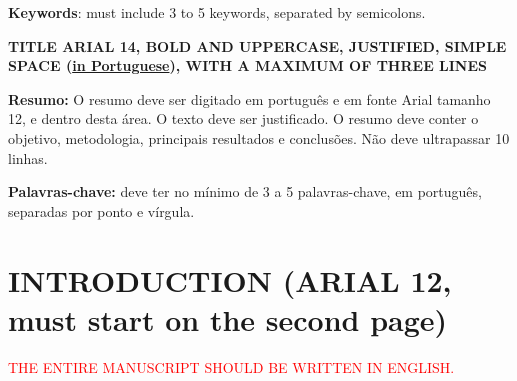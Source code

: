 \documentclass[
	article,			%
	12pt,				%
	oneside,			%
	a4paper,			%
	english,			%
	brazil,				%
	sumario=tradicional
	]{abntex2}
\begin{document}
   \vspace{\onelineskip}
   \noindent
   \textbf{Keywords}: must include 3 to 5 keywords, separated by semicolons.


   \vspace*{1.5cm}
   \noindent
   \textbf{\large{TITLE ARIAL 14, BOLD AND UPPERCASE, JUSTIFIED, SIMPLE SPACE (\underline{in Portuguese}), WITH A MAXIMUM OF THREE LINES}}

   \vspace{\onelineskip}
   \noindent
   \normalsize
   \textbf{Resumo:} O resumo deve ser digitado em português e em fonte Arial tamanho 12, e dentro desta área. O texto deve ser justificado. O resumo deve conter o objetivo, metodologia, principais resultados e conclusões. Não deve ultrapassar 10 linhas.

   \vspace{\onelineskip}
   \noindent
   \textbf{Palavras-chave:} deve ter no mínimo de 3 a 5 palavras-chave, em português, separadas por ponto e vírgula.





\textual
\pagestyle{meuestilo}


\newpage

\section{\textbf{INTRODUCTION (ARIAL 12, must start on the second page)}}

\textcolor{red}{THE ENTIRE MANUSCRIPT SHOULD BE WRITTEN IN ENGLISH.}
\end{document}
